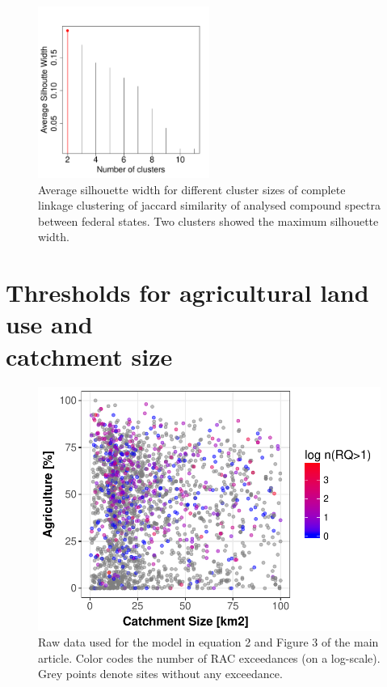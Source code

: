 \begin{figure}[h]
	\centering
	\vspace{-1.5cm} 
	\includegraphics[width = 0.5\textwidth]{appendix/smallstreams/one/silhouette}
	\caption[Average silhouette width for different cluster sizes.]{Average silhouette width for different cluster sizes of complete linkage clustering of jaccard similarity of analysed compound spectra between federal states. Two clusters showed the maximum silhouette width.}
	\label{fig:silhouette}
\end{figure}

\clearpage
\footnotesize





\clearpage
\section[Thresholds for agricultural land use and catchment size]{\texorpdfstring{Thresholds for agricultural land use and \\ catchment size}{Thresholds for agricultural land use and catchment size}}
\begin{figure}[h]
	\includegraphics[width = \textwidth]{appendix/smallstreams/one/ezgagrirac}
	\caption[Raw data used for the model in equation 2 and Figure 3 of the main article.]{Raw data used for the model in equation 2 and Figure 3 of the main article. Color codes the number of RAC exceedances (on a log-scale). Grey points denote sites without any exceedance.}
	\label{fig:ezgagrirac}
\end{figure}



